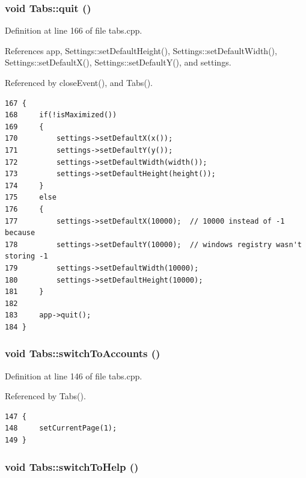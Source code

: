 \hypertarget{classTabs_k8}{
\subsubsection[quit]{\setlength{\rightskip}{0pt plus 5cm}void Tabs::quit ()}}
\label{classTabs_k8}


Definition at line 166 of file tabs.cpp.

References app, Settings::set\-Default\-Height(), Settings::set\-Default\-Width(), Settings::set\-Default\-X(), Settings::set\-Default\-Y(), and settings.

Referenced by close\-Event(), and Tabs().

\footnotesize\begin{verbatim}167 {
168     if(!isMaximized())
169     {
170         settings->setDefaultX(x());
171         settings->setDefaultY(y());
172         settings->setDefaultWidth(width());
173         settings->setDefaultHeight(height());
174     }
175     else
176     {
177         settings->setDefaultX(10000);  // 10000 instead of -1 because
178         settings->setDefaultY(10000);  // windows registry wasn't storing -1
179         settings->setDefaultWidth(10000);
180         settings->setDefaultHeight(10000);
181     }
182     
183     app->quit();
184 }
\end{verbatim}\normalsize 


\hypertarget{classTabs_k4}{
\subsubsection[switchToAccounts]{\setlength{\rightskip}{0pt plus 5cm}void Tabs::switch\-To\-Accounts ()}}
\label{classTabs_k4}


Definition at line 146 of file tabs.cpp.

Referenced by Tabs().

\footnotesize\begin{verbatim}147 {
148     setCurrentPage(1);
149 }
\end{verbatim}\normalsize 


\hypertarget{classTabs_k7}{
\subsubsection[switchToHelp]{\setlength{\rightskip}{0pt plus 5cm}void Tabs::switch\-To\-Help ()}}
\label{classTabs_k7}


